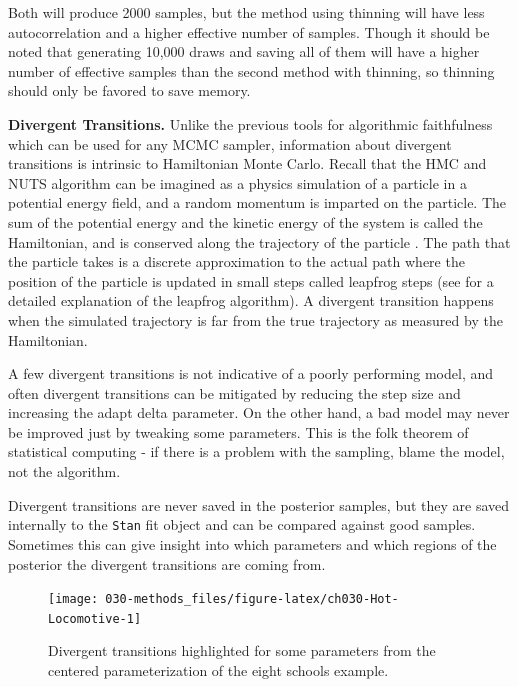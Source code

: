 \documentclass[11pt, oneside, openany]{scrbook}
\begin{document}
Both will produce 2000 samples, but the method using thinning will have less autocorrelation and a higher effective number of samples. Though it should be noted that generating 10,000 draws and saving all of them will have a higher number of effective samples than the second method with thinning, so thinning should only be favored to save memory.

\textbf{Divergent Transitions.} Unlike the previous tools for algorithmic faithfulness which can be used for any MCMC sampler, information about divergent transitions is intrinsic to Hamiltonian Monte Carlo. Recall that the HMC and NUTS algorithm can be imagined as a physics simulation of a particle in a potential energy field, and a random momentum is imparted on the particle. The sum of the potential energy and the kinetic energy of the system is called the Hamiltonian, and is conserved along the trajectory of the particle \citep{stanref}. The path that the particle takes is a discrete approximation to the actual path where the position of the particle is updated in small steps called leapfrog steps (see \citet{leimkuhler2004simulating} for a detailed explanation of the leapfrog algorithm). A divergent transition happens when the simulated trajectory is far from the true trajectory as measured by the Hamiltonian.

A few divergent transitions is not indicative of a poorly performing model, and often divergent transitions can be mitigated by reducing the step size and increasing the adapt delta parameter. On the other hand, a bad model may never be improved just by tweaking some parameters. This is the folk theorem of statistical computing - if there is a problem with the sampling, blame the model, not the algorithm.

Divergent transitions are never saved in the posterior samples, but they are saved internally to the \texttt{Stan} fit object and can be compared against good samples. Sometimes this can give insight into which parameters and which regions of the posterior the divergent transitions are coming from.

\begin{figure}

{\centering \texttt{[image: 030-methods\_files/figure-latex/ch030-Hot-Locomotive-1]} 

}

\caption{Divergent transitions highlighted for some parameters from the centered parameterization of the eight schools example.}\label{fig:ch030-Hot-Locomotive}
\end{figure}
\end{document}

